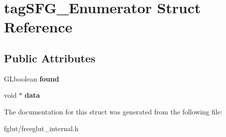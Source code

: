 \hypertarget{structtag_s_f_g___enumerator}{}\section{tag\+S\+F\+G\+\_\+\+Enumerator Struct Reference}
\label{structtag_s_f_g___enumerator}
\subsection*{Public Attributes}
\begin{DoxyCompactItemize}
\item 
G\+Lboolean {\bfseries found}\hypertarget{structtag_s_f_g___enumerator_ac679682bf62faeb4acb687c6403fc9fb}{}\label{structtag_s_f_g___enumerator_ac679682bf62faeb4acb687c6403fc9fb}

\item 
void $\ast$ {\bfseries data}\hypertarget{structtag_s_f_g___enumerator_a2d32f0afef44072c131b2cb3d8f9a4a5}{}\label{structtag_s_f_g___enumerator_a2d32f0afef44072c131b2cb3d8f9a4a5}

\end{DoxyCompactItemize}


The documentation for this struct was generated from the following file\+:\begin{DoxyCompactItemize}
\item 
fglut/freeglut\+\_\+internal.\+h\end{DoxyCompactItemize}
